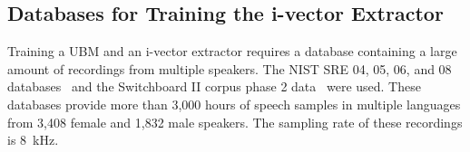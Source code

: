 \subsection{Databases for Training the i-vector Extractor}

Training a UBM and an i-vector extractor requires a database containing a large amount of recordings from multiple speakers. %
The NIST SRE 04, 05, 06, and 08 databases~\cite{alvin2004nist,przybocki2006nist,martin2009nist} and the Switchboard II corpus phase 2 data~\cite{graff1999switchboard} were used. These databases provide more than 3,000 hours of speech samples in multiple languages from 3,408 female and 1,832 male speakers. 
The sampling rate of these recordings is 8~kHz. %

